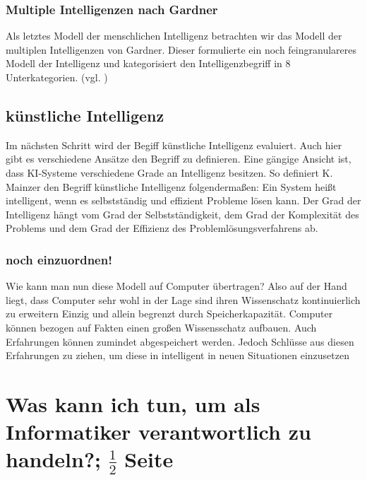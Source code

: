 \documentclass[a4paper, 11pt]{scrartcl}
\begin{document}
\subsubsection{Multiple Intelligenzen nach Gardner}
Als letztes Modell der menschlichen Intelligenz betrachten wir das Modell der multiplen Intelligenzen von Gardner. Dieser formulierte ein noch feingranulareres Modell der Intelligenz und kategorisiert den Intelligenzbegriff in 8 Unterkategorien. (vgl. \cite{Gardner1993})

 \subsection{künstliche Intelligenz}
Im nächsten Schritt wird der Begiff künstliche Intelligenz evaluiert. Auch hier gibt es verschiedene Ansätze den Begriff zu definieren. Eine gängige Ansicht ist, dass KI-Systeme verschiedene Grade an Intelligenz besitzen. So definiert K. Mainzer den Begriff künstliche Intelligenz folgendermaßen: Ein System heißt intelligent, wenn es selbstständig und effizient Probleme lösen kann. Der Grad der Intelligenz hängt vom Grad der Selbstständigkeit, dem Grad der Komplexität des Problems und dem Grad der Effizienz des Problemlösungsverfahrens ab.



\subsubsection{noch einzuordnen!}
Wie kann man nun diese Modell auf Computer übertragen? Also auf der Hand liegt, dass Computer sehr wohl in der Lage sind ihren Wissenschatz kontinuierlich zu erweitern Einzig und allein begrenzt durch Speicherkapazität. Computer können bezogen auf Fakten einen großen Wissensschatz aufbauen. Auch Erfahrungen können zumindet abgespeichert werden. Jedoch Schlüsse aus diesen Erfahrungen zu ziehen, um diese in intelligent in neuen Situationen einzusetzen

\newpage



\section{Was kann ich tun, um als Informatiker verantwortlich zu handeln?; $\frac{1}{2}$ Seite}

\newpage

\printbibliography
\end{document}
